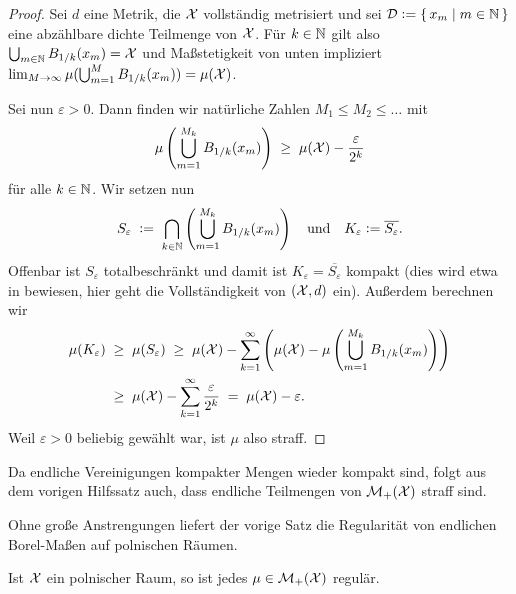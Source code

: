 \documentclass[../main/main.tex]{subfiles}
\begin{document}
	\begin{proof}
		Sei $d$ eine Metrik, die $\mathcal{X}$ vollständig metrisiert und sei 
		$\mathcal{D} \vcentcolon = \left\{\, x_m \; \middle| \; m \in \mathbb{N} \,\right\}$ eine abzählbare dichte Teilmenge von $\mathcal{X}$. 
		Für $k \in \mathbb{N}$ gilt also $\bigcup_{m \in \mathbb{N}} B_{1/k}(x_m) = \mathcal{X}$ und Maßstetigkeit 
		von unten impliziert 
		$\lim_{M \to \infty} \mu(\bigcup_{m=1}^{M} B_{1/k}(x_m)) = \mu(\mathcal{X})$.
		
		Sei nun $\varepsilon > 0$. Dann finden wir natürliche Zahlen $M_1 \leq M_2 \leq \dots$ mit
		\[ \mu\left( \bigcup_{m=1}^{M_k} B_{1/k}(x_m) \right) \; \geq \; \mu(\mathcal{X}) - \frac{\varepsilon}{2^k} \]
		für alle $k \in \mathbb{N}$. Wir setzen nun
		\[ S_\varepsilon 
		\; \vcentcolon = \; \bigcap_{k \in \mathbb{N}} \left( \bigcup_{m=1}^{M_k} B_{1/k}(x_m) \right) 
		\quad \text{und} \quad K_\varepsilon \vcentcolon = \overline{S_\varepsilon} \text{.} \]
		Offenbar ist $S_\varepsilon$ totalbeschränkt und damit ist $K_\varepsilon = \overline{S_\varepsilon}$ 
		kompakt (dies wird etwa in \cite[Satz 2.3.8]{Simon.2015} bewiesen, 
		hier geht die Vollständigkeit von $(\mathcal{X}, d)$ ein).
		Außerdem berechnen wir
		\begin{align*}
			\mu(K_\varepsilon) \; &\geq \; \mu(S_\varepsilon) 
			\; \geq \; \mu(\mathcal{X}) - \sum_{k=1}^{\infty} \left( \mu(\mathcal{X}) - \mu\left( \bigcup_{m=1}^{M_k} B_{1/k}(x_m) \right) \right) \\
			\; &\geq \; \mu(\mathcal{X}) - \sum_{k=1}^{\infty} \frac{\varepsilon}{2^k} \; = \; \mu(\mathcal{X}) - \varepsilon \text{.}
		\end{align*} 
		Weil $\varepsilon > 0$ beliebig gewählt war, ist $\mu$ also straff.
	\end{proof}

	\begin{Bemerkung}
		Da endliche Vereinigungen kompakter Mengen wieder kompakt sind, folgt aus dem vorigen Hilfssatz auch, dass endliche Teilmengen von $\mathcal{M}_{+}(\mathcal{X})$ straff sind.
	\end{Bemerkung}
	
	Ohne große Anstrengungen liefert der vorige Satz die Regularität von endlichen Borel-Maßen auf polnischen Räumen.
	
	\begin{Folgerung}
		\label{folgerung:polnischer_raum_reguläre_maße}
		Ist $\mathcal{X}$ ein polnischer Raum, so ist jedes $\mu \in \mathcal{M}_{+}(\mathcal{X})$ regulär.
	\end{Folgerung}
	
\end{document}
